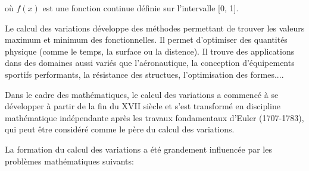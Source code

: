 \documentclass[11pt,a4paper]{report}%
\begin{document}
	où $ f (x)$ est une fonction continue définie sur l'intervalle [0, 1].
	
	
	Le calcul des variations développe des méthodes permettant de trouver les valeurs maximum et minimum des fonctionnelles. Il permet d'optimiser des quantités physique (comme le temps, la surface ou la distence). Il trouve des applications dans des domaines aussi variés que l'aéronautique, la conception d'équipements sportifs performants, la résistance des structues, l'optimisation des formes....
	
	Dans le cadre des mathématiques, le calcul des variations a commencé à se développer à partir de la fin du XVII siècle et s'est transformé en discipline mathématique indépendante après les travaux fondamentaux d'Euler (1707-1783), qui peut être considéré comme le père du calcul des variations.
	
	La formation du calcul des variations a été grandement influencée par les problèmes mathématiques suivants:
%	 	
%	 	
%	 	
%	 	
%	 	
%	 	
%	 	
	
\end{document}
